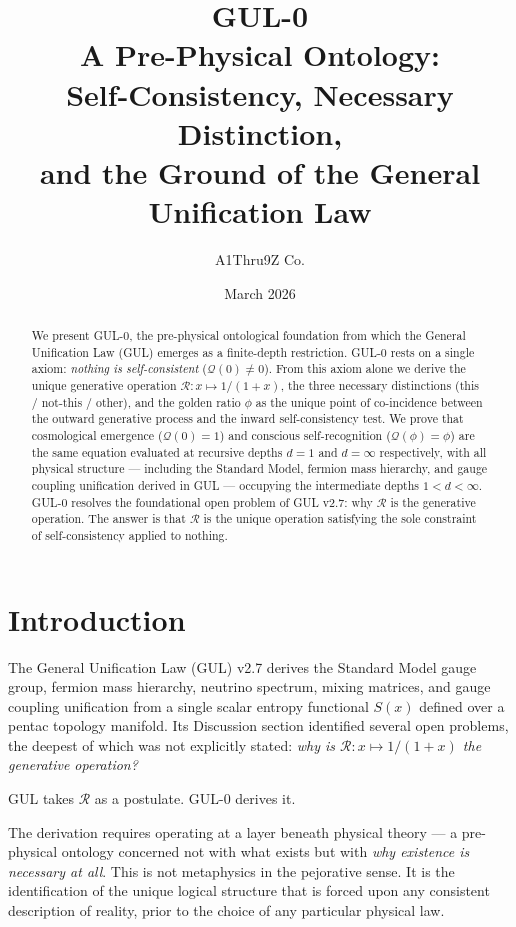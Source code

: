 \documentclass[11pt]{article}
\title{%
  GUL-0\\[4pt]
  \large A Pre-Physical Ontology:\\
  Self-Consistency, Necessary Distinction,\\
  and the Ground of the General Unification Law
}
\author{A1Thru9Z Co.}
\date{March 2026}
\begin{document}
\maketitle

\begin{abstract}
We present GUL-0, the pre-physical ontological foundation from which the
General Unification Law (GUL) emerges as a finite-depth restriction. GUL-0
rests on a single axiom: \emph{nothing is self-consistent}
($\mathcal{Q}(0)\neq 0$). From this axiom alone we derive the unique
generative operation $\mathcal{R}:x\mapsto 1/(1+x)$, the three necessary
distinctions (this / not-this / other), and the golden ratio $\phi$ as the
unique point of co-incidence between the outward generative process and the
inward self-consistency test. We prove that cosmological emergence
($\mathcal{Q}(0)=1$) and conscious self-recognition ($\mathcal{Q}(\phi)=\phi$)
are the same equation evaluated at recursive depths $d=1$ and $d=\infty$
respectively, with all physical structure --- including the Standard Model,
fermion mass hierarchy, and gauge coupling unification derived in GUL --- occupying
the intermediate depths $1<d<\infty$. GUL-0 resolves the foundational
open problem of GUL v2.7: why $\mathcal{R}$ is the generative operation.
The answer is that $\mathcal{R}$ is the unique operation satisfying the
sole constraint of self-consistency applied to nothing.
\end{abstract}

\tableofcontents
\newpage

\section{Introduction}

The General Unification Law (GUL) v2.7 derives the Standard Model gauge
group, fermion mass hierarchy, neutrino spectrum, mixing matrices, and
gauge coupling unification from a single scalar entropy functional
$S(x)$ defined over a pentac topology manifold. Its Discussion section
identified several open problems, the deepest of which was not explicitly
stated: \emph{why is $\mathcal{R}:x\mapsto 1/(1+x)$ the generative
operation?}

GUL takes $\mathcal{R}$ as a postulate. GUL-0 derives it.

The derivation requires operating at a layer beneath physical theory ---
a pre-physical ontology concerned not with what exists but with
\emph{why existence is necessary at all}. This is not metaphysics in
the pejorative sense. It is the identification of the unique logical
structure that is forced upon any consistent description of reality,
prior to the choice of any particular physical law.
\end{document}
